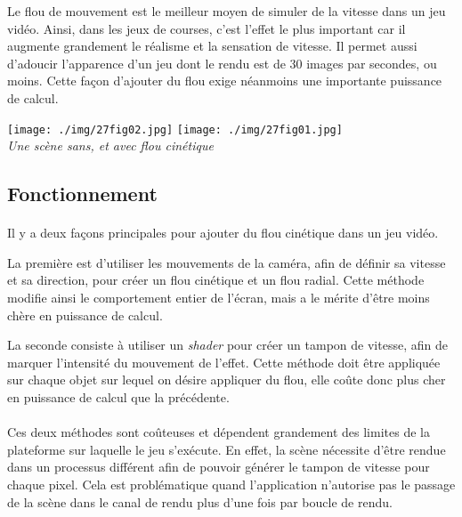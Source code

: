 \documentclass[a4paper]{article}
\begin{document}
Le flou de mouvement est le meilleur moyen de simuler de la vitesse dans un jeu vidéo. Ainsi, dans les jeux de courses, c'est l'effet le plus important car il augmente grandement le réalisme et la sensation de vitesse. Il permet aussi d'adoucir l'apparence d'un jeu dont le rendu est de 30 images par secondes, ou moins. Cette façon d'ajouter du flou exige néanmoins une importante puissance de calcul.

\vspace{0.5cm}

\begin{center}
\texttt{[image: ./img/27fig02.jpg]}\hspace{0.6cm}
\texttt{[image: ./img/27fig01.jpg]}\\
\textit{Une scène sans, et avec flou cinétique}
\end{center}

\subsection{Fonctionnement}
\paragraph{} Il y a deux façons principales pour ajouter du flou cinétique dans un jeu vidéo.

La première est d'utiliser les mouvements de la caméra, afin de définir sa vitesse et sa direction, pour créer un flou cinétique et un flou radial. Cette méthode modifie ainsi le comportement entier de l'écran, mais a le mérite d'être moins chère en puissance de calcul.

La seconde consiste à utiliser un \textit{shader} pour créer un tampon de vitesse, afin de marquer l'intensité du mouvement de l'effet. Cette méthode doit être appliquée sur chaque objet sur lequel on désire appliquer du flou, elle coûte donc plus cher en puissance de calcul que la précédente.

\paragraph{} Ces deux méthodes sont coûteuses et dépendent grandement des limites de la plateforme sur laquelle le jeu s'exécute. En effet, la scène nécessite d'être rendue dans un processus différent afin de pouvoir générer le tampon de vitesse pour chaque pixel. Cela est problématique quand l'application n'autorise pas le passage de la scène dans le canal de rendu plus d'une fois par boucle de rendu.
\end{document}
